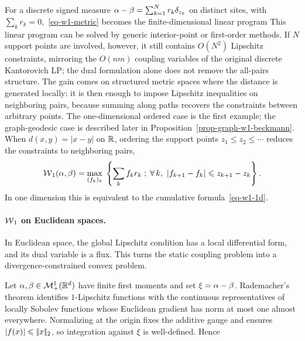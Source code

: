 For a discrete signed measure $\alpha-\beta=\sum_{k=1}^N r_k\delta_{z_k}$ on distinct sites, with $\sum_k r_k=0$,~\eqref{eq-w1-metric} becomes the finite-dimensional linear program
This linear program can be solved by generic interior-point or first-order methods. If $N$ support points are involved, however, it still contains $O(N^2)$ Lipschitz constraints, mirroring the $O(nm)$ coupling variables of the original discrete Kantorovich LP; the dual formulation alone does not remove the all-pairs structure. The gain comes on structured metric spaces where the distance is generated locally: it is then enough to impose Lipschitz inequalities on neighboring pairs, because summing along paths recovers the constraints between arbitrary points. The one-dimensional ordered case is the first example; the graph-geodesic case is described later in Proposition~\ref{prop-graph-w1-beckmann}.
When $d(x,y)=|x-y|$ on $\mathbb{R}$, ordering the support points $z_1\leq z_2\leq\cdots$ reduces the constraints to neighboring pairs,
\[
	\operatorname{\mathcal{W}}_1(\alpha,\beta)
	=
	\underset{(f_k)_k}{\max}\;
	\left\{ \sum_k f_k r_k \;;\; \forall \, k,\ |f_{k+1}-f_k|\leqslant z_{k+1}-z_k \right\}.
\]
In one dimension this is equivalent to the cumulative formula~\eqref{eq-w1-1d}.

\paragraph{$\operatorname{\mathcal{W}}_1$ on Euclidean spaces.}

In Euclidean space, the global Lipschitz condition has a local differential form, and its dual variable is a flux. This turns the static coupling problem into a divergence-constrained convex problem.

Let $\alpha,\beta\in\mathcal{M}_+^1(\mathbb{R}^d)$ have finite first moments and set $\xi=\alpha-\beta$. Rademacher's theorem identifies $1$-Lipschitz functions with the continuous representatives of locally Sobolev functions whose Euclidean gradient has norm at most one almost everywhere. Normalizing at the origin fixes the additive gauge and ensures $|f(x)|\leqslant|\!| x |\!|_2$, so integration against $\xi$ is well-defined. Hence

